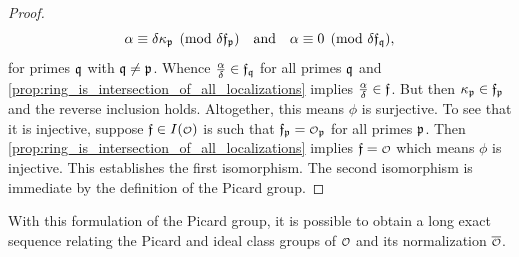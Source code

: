 \begin{proof}
      \[
        \alpha \equiv \delta\kappa_{\mathfrak{p}} \pmod{\delta\mathfrak{f}_{\mathfrak{p}}} \quad \text{and} \quad \alpha \equiv 0 \pmod{\delta\mathfrak{f}_{\mathfrak{q}}},
      \]
      for primes \(\mathfrak{q}\) with \(\mathfrak{q} \neq \mathfrak{p}\). Whence \(\frac{\alpha}{\delta} \in \mathfrak{f}_{\mathfrak{q}}\) for all primes \(\mathfrak{q}\) and \cref{prop:ring_is_intersection_of_all_localizations} implies \(\frac{\alpha}{\delta} \in \mathfrak{f}\). But then \(\kappa_{\mathfrak{p}} \in \mathfrak{f}_{\mathfrak{p}}\) and the reverse inclusion holds. Altogether, this means \(\phi\) is surjective. To see that it is injective, suppose \(\mf{f} \in I(\smc{O})\) is such that \(\mf{f}_{\mf{p}} = \smc{O}_{\mf{p}}\) for all primes \(\mathfrak{p}\). Then \cref{prop:ring_is_intersection_of_all_localizations} implies \(\mf{f} = \smc{O}\) which means \(\phi\) is injective. This establishes the first isomorphism. The second isomorphism is immediate by the definition of the Picard group.
    \end{proof}

    With this formulation of the Picard group, it is possible to obtain a long exact sequence relating the Picard and ideal class groups of \(\smc{O}\) and its normalization \(\conj{\smc{O}}\).

